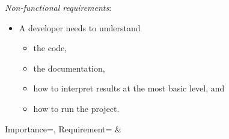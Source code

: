 \noindent \newline
\emph{Non-functional requirements}:
\begin{itemize}
    \item A developer needs to understand
    \begin{itemize}
        \item the code,
        \item the documentation,
        \item how to interpret results at the most basic level, and
        \item how to run the project.
    \end{itemize}
\end{itemize}

\begin{table}[htb]\centering
    \caption{Functional requirements with their importance, higher rows correspond to higher priority. For a further dissection of minimal viable requirements, see Appendix~\ref{appendix:backlog}}\label{tab:requirements-with-scope}
    {Importance=\importance, Requirement=\requirement}{%
        \importance & \requirement
    }
\end{table}
